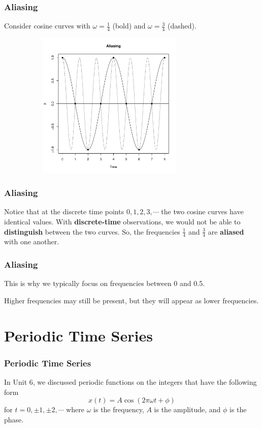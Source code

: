 \documentclass[%
xcolor=pdftex]{beamer}
\begin{document}
\begin{frame}
\frametitle{Aliasing}

Consider cosine curves with $\omega=\frac{1}{4}$ (bold) and $\omega=\frac{3}{4}$ (dashed).

\includegraphics[width=110mm, height=70mm]{alias.pdf}

\end{frame}

\begin{frame}
\frametitle{Aliasing}

Notice that at the discrete time points $0, 1, 2, 3, \cdots$ the two cosine curves have identical values. With \textbf{discrete-time} observations, we would not be able to \textbf{distinguish} between the two curves. So, the frequencies $\frac{1}{4}$ and $\frac{3}{4}$ are \textbf{aliased} with one another.

\end{frame}

\begin{frame}
\frametitle{Aliasing}

This is why we typically focus on frequencies between 0 and 0.5. 
\newline

Higher frequencies may still be present, but they will appear as lower frequencies.


\end{frame}



\section{Periodic Time Series}
\frame{\tableofcontents[currentsection]}

\begin{frame}
\frametitle{Periodic Time Series}

In Unit 6, we discussed periodic functions on the integers that have the following form
$$
x(t)=A \cos(2 \pi \omega t +\phi)
$$
for $t=0, \pm 1, \pm 2, \cdots $ where $\omega$ is the frequency, $A$ is the amplitude, and $\phi$ is the phase.

\end{frame}
\end{document}
